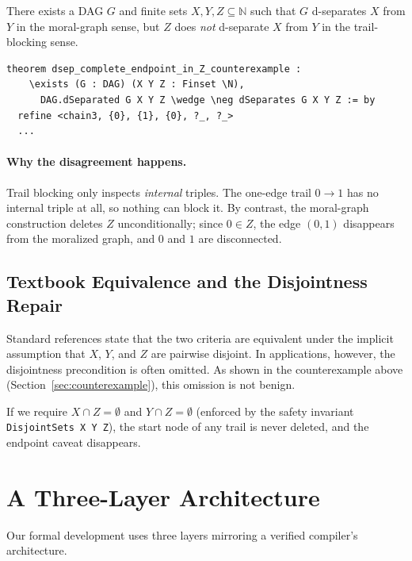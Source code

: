 \documentclass[acmsmall,screen,review,anonymous,nonacm]{acmart}
\newcommand{\lean}[1]{\lstinline!#1!}
\newcommand{\N}{\mathbb{N}}
\begin{document}
\begin{theorem}\label{thm:counterexample}
There exists a DAG $G$ and finite sets $X, Y, Z \subseteq \N$ such that
$G$ d-separates $X$ from $Y$ in the moral-graph sense, but $Z$ does \emph{not}
d-separate $X$ from $Y$ in the trail-blocking sense.
\end{theorem}

\begin{lstlisting}[caption={Mechanized counterexample}]
theorem dsep_complete_endpoint_in_Z_counterexample :
    \exists (G : DAG) (X Y Z : Finset \N),
      DAG.dSeparated G X Y Z \wedge \neg dSeparates G X Y Z := by
  refine <chain3, {0}, {1}, {0}, ?_, ?_>
  ...
\end{lstlisting}

\paragraph{Why the disagreement happens.} Trail blocking only inspects
\emph{internal} triples.  The one-edge trail $0 \to 1$ has no internal triple at
all, so nothing can block it.  By contrast, the moral-graph construction deletes
$Z$ unconditionally; since $0 \in Z$, the edge $(0,1)$ disappears from the
moralized graph, and $0$ and $1$ are disconnected.

\subsection{Textbook Equivalence and the Disjointness Repair}\label{sec:repair}

Standard references state that the two criteria are equivalent under the implicit
assumption that $X$, $Y$, and $Z$ are pairwise disjoint.  In applications,
however, the disjointness precondition is often omitted.  As shown in the
counterexample above (Section~\ref{sec:counterexample}), this omission is not benign.

If we require $X \cap Z = \emptyset$ and
$Y \cap Z = \emptyset$ (enforced by the safety invariant
\lean{DisjointSets X Y Z}), the start node of any trail is never deleted, and the
endpoint caveat disappears.

\section{A Three-Layer Architecture}\label{sec:architecture}

Our formal development uses three layers mirroring a verified compiler's architecture.
\end{document}
